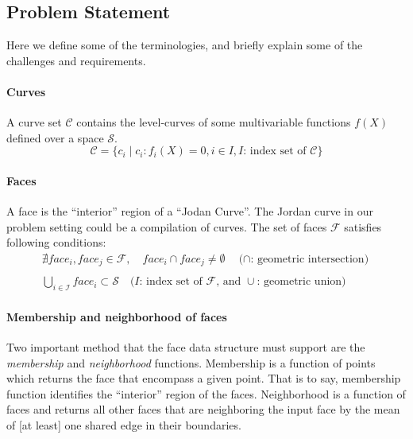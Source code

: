 \subsection{Problem Statement}

Here we define some of the terminologies, and briefly explain some of the challenges and requirements.

\paragraph{Curves}
A curve set $\mathcal{C}$ contains the level-curves of some multivariable functions $f(X)$ defined over a space $\mathcal{S}$.
\[
\mathcal{C} = \lbrace c_i \mid c_i: f_i(X)=0, i \in I, \text{$I$: index set of $\mathcal{C}$} \rbrace
\]

\paragraph{Faces}
A face is the ``interior'' region of a ``Jodan Curve''.
The Jordan curve in our problem setting could be a compilation of curves.
The set of faces $\mathcal{F}$ satisfies following conditions:
\[
\begin{array}{l}
  \nexists face_i , face_j \in \mathcal{F}, \quad face_i \cap face_j \neq \emptyset \quad \text{($\cap$: geometric intersection)}\\
  \quad \\
  \displaystyle\bigcup_{ i \in \mathcal{I} } face_i \subset \mathcal{S} \quad \text{($I$: index set of $\mathcal{F}$, and $\cup$: geometric union)}
\end{array}
\]

\paragraph{Membership and neighborhood of faces}
Two important method that the face data structure must support are the \emph{membership} and \emph{neighborhood} functions.
Membership is a function of points which returns the face that encompass a given point.
That is to say, membership function identifies the ``interior'' region of the faces.
Neighborhood is a function of faces and returns all other faces that are neighboring the input face by the mean of [at least] one shared edge in their boundaries.

